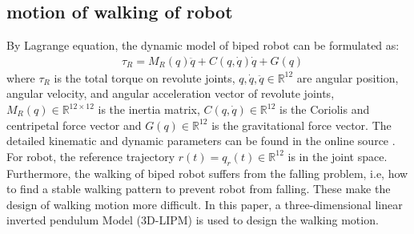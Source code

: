 \documentclass{ieeeaccess}
\begin{document}
\subsection{motion of walking of robot}
By Lagrange equation, the dynamic model of biped robot can be formulated as:
\begin{equation} \label{eq:robot} 
    \begin{split}
        & \tau_R = M_R(q)\ddot{q} + C(q,\dot{q})\dot{q} + G(q)    
    \end{split}
\end{equation}
where $\tau_R$ is the total torque on revolute joints, $q,\dot{q},\ddot{q}\in\mathbb{R}^{12}$  are angular position, angular velocity, and angular acceleration vector of revolute joints, $M_R(q)\in\mathbb{R}^{12\times 12}$ is the inertia matrix, $C(q,\dot{q})\in\mathbb{R}^{12}$ is the Coriolis and centripetal force vector and $G(q)\in\mathbb{R}^{12}$ is the gravitational force vector. The detailed kinematic and dynamic parameters can be found in the online source \cite{ourrobot}. For robot, the reference trajectory $r(t)=q_r(t)\in\mathbb{R}^{12}$ is in the joint space. Furthermore, the walking of biped robot suffers from the falling problem, i.e, how to find a stable walking pattern to prevent robot from falling. These make the design of walking motion more difficult. In this paper, a three-dimensional linear inverted pendulum Model (3D-LIPM) \cite{kajita2001real} is used to design the walking motion.
\end{document}

